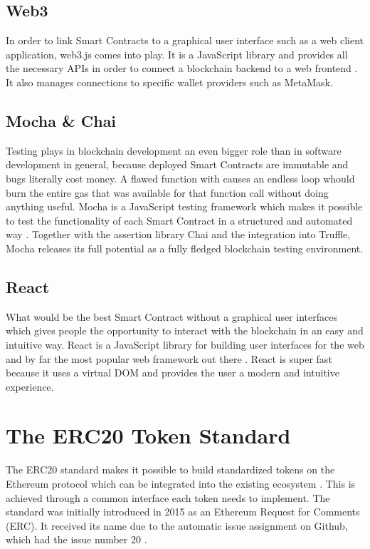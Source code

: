\subsection{Web3}
In order to link Smart Contracts to a graphical user interface such as a web client application, web3.js comes into play. It is a JavaScript library and provides all the necessary APIs in order to connect a blockchain backend to a web frontend \cite{Web3}. It also manages connections to specific wallet providers such as MetaMask.

\subsection{Mocha \& Chai}
Testing plays in blockchain development an even bigger role than in software development in general, because deployed Smart Contracts are immutable and bugs literally cost money. A flawed function with causes an endless loop whould burn the entire gas that was available for that function call without doing anything useful. Mocha is a JavaScript testing framework which makes it possible to test the functionality of each Smart Contract in a structured and automated way \cite{Mocha}. Together with the assertion library Chai \cite{Chai} and the integration into Truffle, Mocha releases its full potential as a fully fledged blockchain testing environment.

\subsection{React}
What would be the best Smart Contract without a graphical user interfaces which gives people the opportunity to interact with the blockchain in an easy and intuitive way. React is a JavaScript library for building user interfaces for the web and by far the most popular web framework out there \cite{React}. React is super fast because it uses a virtual DOM and provides the user a modern and intuitive experience.

\section{The ERC20 Token Standard}
The ERC20 standard makes it possible to build standardized tokens on the Ethereum protocol which can be integrated into the existing ecosystem \cite{ERC20}. This is achieved through a common interface each token needs to implement. The standard was initially introduced in 2015 as an Ethereum Request for Comments (ERC). It received its name due to the automatic issue assignment on Github, which had the issue number 20 \cite{AntonopoulosWood2018} \cite{BadrHorrocksWu2018}.

